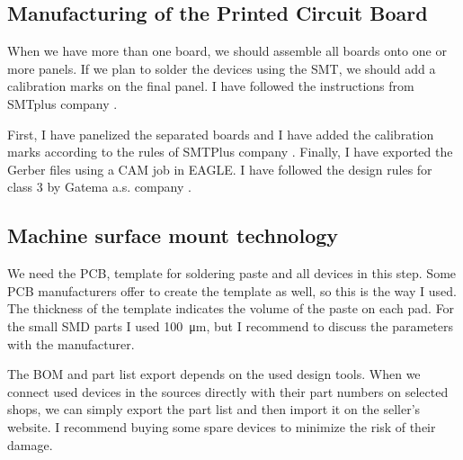 \subsection{Manufacturing of the Printed Circuit Board}
When we have more than one board, we should assemble all boards onto one or more panels. If we plan to solder the devices using the \ac{SMT}, we should add a calibration marks on the final panel. I have followed the instructions from SMTplus company \cite{SMTplusManual}.

First, I have panelized the separated boards and I have added the calibration marks according to the rules of SMTPlus company \cite{SMTplusDesignRules}. Finally, I have exported the Gerber files using a CAM job \cite{GatemaCAMjob} in \ac{EAGLE}. I have followed the design rules for class 3 by Gatema a.s. company \cite{GatemaDesignRules}.

\subsection{Machine surface mount technology}
We need the \ac{PCB}, template for soldering paste and all devices in this step. Some \ac{PCB} manufacturers offer to create the template as well, so this is the way I used. The thickness of the template indicates the volume of the paste on each pad. For the small \ac{SMD} parts I used \SI{100}{\micro\meter}, but I recommend to discuss the parameters with the manufacturer.

The \ac{BOM} and part list export depends on the used design tools. When we connect used devices in the sources directly with their part numbers on selected shops, we can simply export the part list and then import it on the seller's website. I recommend buying some spare devices to minimize the risk of their damage.

